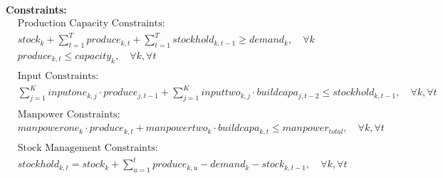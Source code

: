 \documentclass{article}
\begin{document}
\textbf{Constraints:}
\begin{align}
    & \text{Production Capacity Constraints:} \\
    & stock_{k} + \sum_{t=1}^T produce_{k, t} + \sum_{t=1}^T stockhold_{k, t-1} \geq demand_{k}, \quad \forall k \\
    & produce_{k, t} \leq capacity_{k}, \quad \forall k, \forall t \\
    \\
    & \text{Input Constraints:} \\
    & \sum_{j=1}^K inputone_{k, j} \cdot produce_{j, t-1} + \sum_{j=1}^K inputtwo_{k, j} \cdot buildcapa_{j, t-2} \leq stockhold_{k, t-1}, \quad \forall k, \forall t \\
    \\
    & \text{Manpower Constraints:} \\
    & manpowerone_{k} \cdot produce_{k, t} + manpowertwo_{k} \cdot buildcapa_{k, t} \leq manpower_{total}, \quad \forall k, \forall t \\
    \\
    & \text{Stock Management Constraints:} \\
    & stockhold_{k, t} = stock_{k} + \sum_{u=1}^t produce_{k, u} - demand_{k} - stock_{k, t-1}, \quad \forall k, \forall t
\end{align}
\end{document}
